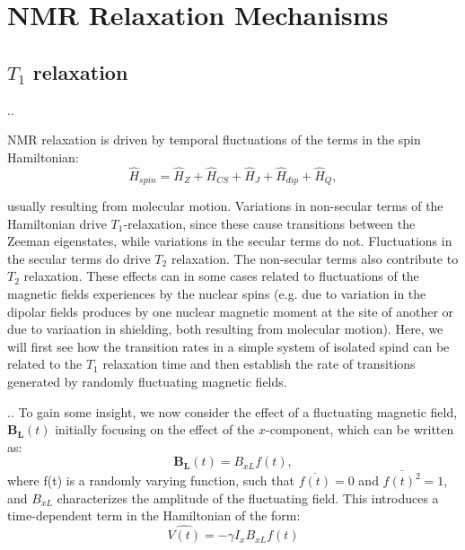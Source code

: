 \documentclass{beamer}
\begin{document}
\section{NMR Relaxation Mechanisms}
\subsection{$T_1$ relaxation}

\begin{frame}{\thesection.\thesubsection. \insertsubsection}

   NMR relaxation is driven by temporal fluctuations of the terms in the spin Hamiltonian:
   \begin{equation}
     \hat{H}_{spin} = \hat{H}_Z + \hat{H}_{CS} + \hat{H}_J + \hat{H}_{dip} + \hat{H}_Q, 
   \end{equation} 

   usually resulting from molecular motion.     Variations in non-secular terms of the Hamiltonian drive $T_1$-relaxation, since these cause transitions between the Zeeman eigenstates, while variations in the secular terms do not. Fluctuations in the secular terms do drive $T_2$ relaxation. The non-secular terms also contribute to $T_2$ relaxation.
   These effects can in some cases related to fluctuations of the magnetic fields experiences by the nuclear spins (e.g. due to variation in the dipolar fields produces by one nuclear magnetic moment at the site of another or due to variaation in shielding, both resulting from molecular motion). Here, we will first see how the transition rates in a simple system of isolated spind can be related to the $T_1$ relaxation time and then establish the rate of transitions generated by randomly fluctuating magnetic fields.
\end{frame}

\begin{frame}{\thesection.\thesubsection. \insertsubsection}
	\onslide<1>
   To gain some insight, we now consider the effect of a fluctuating magnetic field, $\bm{B_L}(t)$ initially focusing on the effect of the $x$-component, which can be written as:
    \begin{equation}
       \bm{B_L}(t) = B_{xL} f(t),
    \end{equation}
    where f(t) is a randomly varying function, such that $\overline{f(t)} = 0$ and $\overline{f(t)^2} = 1$, and $B_{xL}$ characterizes the amplitude of the fluctuating field.   This introduces a time-dependent term in the Hamiltonian of the form:
    \begin{equation}
      \hat{V(t)} = - \gamma \hat{I}_x B_{xL} f(t)
    \end{equation}


    
\end{frame}
\end{document}
